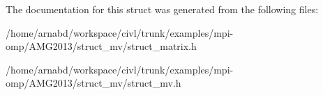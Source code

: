 The documentation for this struct was generated from the following files\+:\begin{DoxyCompactItemize}
\item 
/home/arnabd/workspace/civl/trunk/examples/mpi-\/omp/\+A\+M\+G2013/struct\+\_\+mv/struct\+\_\+matrix.\+h\item 
/home/arnabd/workspace/civl/trunk/examples/mpi-\/omp/\+A\+M\+G2013/struct\+\_\+mv/struct\+\_\+mv.\+h\end{DoxyCompactItemize}
